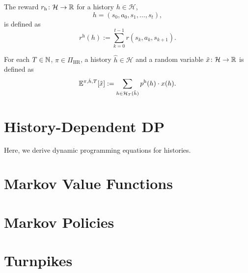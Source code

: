 \begin{definition}
  The reward $r_{\mathrm{h}}\colon \mathcal{H} \to \mathbb{R}$ for a history $h \in  \mathcal{H}$,
  \[
   h = (s_0, a_0, s_1, \dots , s_t), 
  \]
  is defined as
  \[
   r^{\mathrm{h}}(h) := \sum_{k=0}^{t-1} r(s_k, a_k, s_{k+1}).
 \]
 \leanok
\end{definition}

\begin{definition}
  For each $T\in \mathbb{N}$, $\pi\in \Pi_{\mathrm{HR}}$, a history $\hat{h}\in \mathcal{H}$ and a random variable $\tilde{x}\colon \mathcal{H} \to \mathbb{R}$ is defined as
  \[
   \mathbb{E}^{\pi, \hat{h}, T} [\tilde{x}]  := \sum_{h\in \mathcal{H}_T(\hat{h})} p^{\mathrm{h}}(h) \cdot x(h).
 \]
 \lean{}
\end{definition}

\section{History-Dependent DP}

Here, we derive dynamic programming equations for histories.

\section{Markov Value Functions}


\section{Markov Policies}

\section{Turnpikes}

